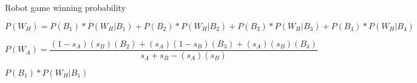 \documentclass[12pt]{article}
\begin{document}
Robot game winning probability

\begin{equation}
    P(W_{H}) = P(B_{1}) * P(W_{H} | B_{1}) + P(B_{2}) * P(W_{H} | B_{2}) + P(B_{3}) * P(W_{H} | B_{3}) + P(B_{4}) * P(W_{H} | B_{4})
\end{equation}

\begin{equation}
    P(W_{A}) = \frac{(1-s_{A})(s_{B})(B_{2}) + (s_{A})(1-s_{B})(B_{3})+(s_{A})(s_{B})(B_{4})}{s_{A} + s_{B} - (s_{A})(s_{B})}
\end{equation}

\( P(B_{1}) * P(W_{H} | B_{1})
\)
\end{document}
